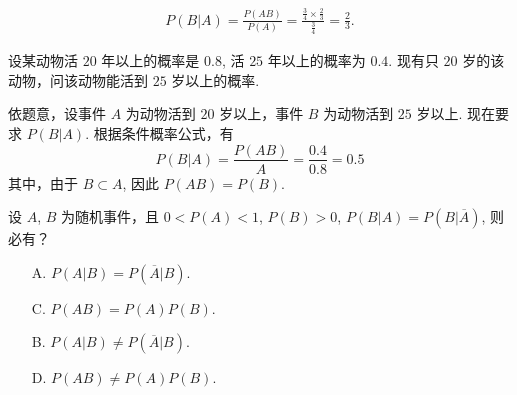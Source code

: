 \documentclass[12pt, a4paper, oneside, UTF8]{ctexbook}
\begin{document}
\begin{solution}
    \begin{align*}
        P\left(B | A\right) = \frac{P\left(AB\right)}{P\left(A\right)} = \frac{\frac{3}{4}\times \frac{2}{3}}{\frac{3}{4}} = \frac{2}{3}.
    \end{align*}
\end{solution}

\begin{example}
    设某动物活 \(20\) 年以上的概率是 \(0.8\), 活 \(25\) 年以上的概率为 \(0.4\). 现有只 \(20\) 岁的该动物，问该动物能活到 \(25\) 岁以上的概率.
\end{example}

\begin{solution}
    依题意，设事件 \(A\) 为动物活到 \(20\) 岁以上，事件 \(B\) 为动物活到 \(25\) 岁以上. 现在要求 \(P\left(B | A\right)\). 根据条件概率公式，有
    \[P\left(B | A\right) = \frac{P\left(AB\right)}{A} = \frac{0.4}{0.8} = 0.5\]
    其中，由于 \(B \subset A\), 因此 \(P\left(AB\right) = P\left(B\right)\).
\end{solution}

\begin{example}
    设 \(A\), \(B\) 为随机事件，且 \(0 < P\left(A\right) < 1\), \(P\left(B\right) > 0\), \(P\left(B | A\right) = P\left(B | \overline{A}\right)\), 则必有？
      
    \vspace{0.5cm}

    \begin{minipage}[l]{0.45\textwidth}
        \begin{enumerate}
            \item[A.] \(P\left(A | B\right) = P\left(\overline{A} | B\right)\).
            \item[C.] \(P\left(AB\right) = P\left(A\right)P\left(B\right)\).
        \end{enumerate}
    \end{minipage}
    \begin{minipage}[c]{0.45\textwidth}
        \begin{enumerate}
            \item[B.] \(P\left(A | B\right) \neq P\left(\overline{A} | B\right)\).
            \item[D.] \(P\left(AB\right) \neq P\left(A\right)P\left(B\right)\).
        \end{enumerate}
    \end{minipage}
\end{example}
\end{document}
